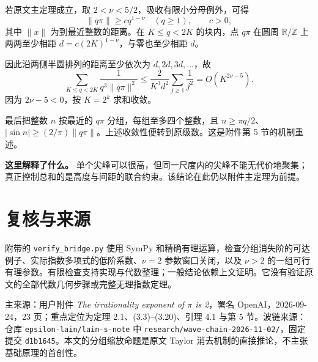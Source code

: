 \documentclass[11pt,a4paper]{article}
\begin{document}
若原文主定理成立，取 $2<\nu<5/2$，吸收有限小分母例外，可得
\[
 \|q\pi\|\ge cq^{1-\nu}\quad(q\ge1),\qquad c>0,
\]
其中 $\|x\|$ 为到最近整数的距离。在 $K\le q<2K$ 的块内，点 $q\pi$ 在圆周 $\mathbb R/\mathbb Z$ 上两两至少相距
$d=c(2K)^{1-\nu}$，与零也至少相距 $d$。

因此沿两侧半圆排列的距离至少依次为 $d,2d,3d,\ldots$，故
\[
 \sum_{K\le q<2K}\frac1{q^3\|q\pi\|^2}
 \le\frac{2}{K^3d^2}\sum_{j\ge1}\frac1{j^2}
 =O(K^{2\nu-5}).
\]
因为 $2\nu-5<0$，按 $K=2^k$ 求和收敛。

最后把整数 $n$ 按最近的 $q\pi$ 分组，每组至多四个整数，且
$n\ge\pi q/2$、$|\sin n|\ge(2/\pi)\|q\pi\|$。上述收敛性便转到原级数。这是附件第 5 节的机制重述。

\textbf{这里解释了什么。} 单个尖峰可以很高，但同一尺度内的尖峰不能无代价地聚集；真正控制总和的是高度与间距的联合约束。该结论在此仍以附件主定理为前提。

\section*{复核与来源}
附带的 \texttt{verify\_bridge.py} 使用 SymPy 和精确有理运算，检查分组消失阶的可达例子、实际指数多项式的低阶系数、$\nu=2$ 参数窗口关闭，以及 $\nu>2$ 的一组可行有理参数。有限检查支持实现与代数整理；一般结论依赖上文证明。它没有验证原文的全部代数几何步骤或完整无理指数定理。

主来源：用户附件 \emph{The irrationality exponent of $\pi$ is 2}，署名 OpenAI，2026-09-24，23 页；重点定位为定理 2.1、(3.3)--(3.20)、引理 4.1 与第 5 节。波链来源：仓库 \texttt{epsilon-lain/lain-s-note} 中 \texttt{research/wave-chain-2026-11-02/}，固定提交 \texttt{d1b1645}。本文的分组缩放命题是原文 Taylor 消去机制的直接推论，不主张基础原理的首创性。
\end{document}
